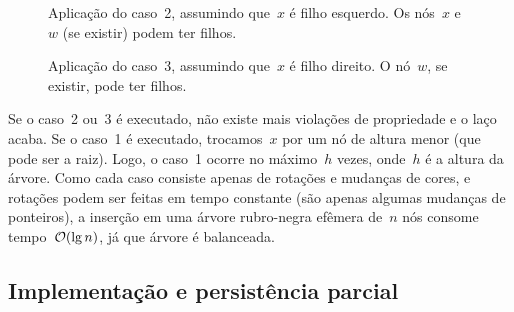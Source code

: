 \documentclass[main.tex]{subfiles}
\begin{document}
\begin{figure}
\centering
{}
\caption{Aplicação do caso~2, assumindo que~$x$ é filho esquerdo. Os nós~$x$ e~$w$ (se existir) podem ter filhos.} \label{fig:rb_ins_caso2}
\end{figure}

\begin{figure}
\centering
{}
\caption{Aplicação do caso~3, assumindo que~$x$ é filho direito. O nó~$w$, se existir, pode ter filhos.} \label{fig:rb_ins_caso3}
\end{figure}

Se o caso~2 ou~3 é executado, não existe mais violações de propriedade e o laço acaba. Se o caso~1 é executado, trocamos~$x$ por um nó de altura menor (que pode ser a raiz). Logo, o caso~1 ocorre no máximo~$h$ vezes, onde~$h$ é a altura da árvore. Como cada caso consiste apenas de rotações e mudanças de cores, e rotações podem ser feitas em tempo constante (são apenas algumas mudanças de ponteiros), a inserção em uma árvore rubro-negra efêmera de~$n$ nós consome tempo~$\mathcal{O}(\lg n)$, já que árvore é balanceada.

\subsection{Implementação e persistência parcial}
\end{document}
